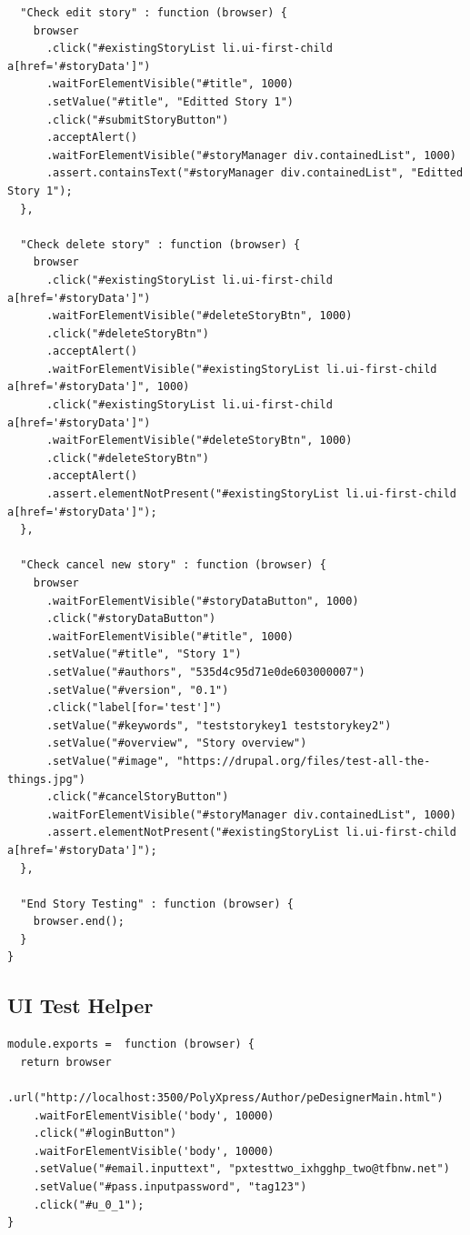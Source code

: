 \documentclass[12pt]{ucthesis}
\begin{document}
\begin{lstlisting}
  "Check edit story" : function (browser) {
    browser
      .click("#existingStoryList li.ui-first-child a[href='#storyData']")
      .waitForElementVisible("#title", 1000)
      .setValue("#title", "Editted Story 1")
      .click("#submitStoryButton")
      .acceptAlert()
      .waitForElementVisible("#storyManager div.containedList", 1000)
      .assert.containsText("#storyManager div.containedList", "Editted Story 1");
  },

  "Check delete story" : function (browser) {
    browser
      .click("#existingStoryList li.ui-first-child a[href='#storyData']")
      .waitForElementVisible("#deleteStoryBtn", 1000)
      .click("#deleteStoryBtn")
      .acceptAlert()
      .waitForElementVisible("#existingStoryList li.ui-first-child a[href='#storyData']", 1000)
      .click("#existingStoryList li.ui-first-child a[href='#storyData']")
      .waitForElementVisible("#deleteStoryBtn", 1000)
      .click("#deleteStoryBtn")
      .acceptAlert()
      .assert.elementNotPresent("#existingStoryList li.ui-first-child a[href='#storyData']");
  },

  "Check cancel new story" : function (browser) {
    browser
      .waitForElementVisible("#storyDataButton", 1000)
      .click("#storyDataButton")
      .waitForElementVisible("#title", 1000)
      .setValue("#title", "Story 1")
      .setValue("#authors", "535d4c95d71e0de603000007")
      .setValue("#version", "0.1")
      .click("label[for='test']")
      .setValue("#keywords", "teststorykey1 teststorykey2")
      .setValue("#overview", "Story overview")
      .setValue("#image", "https://drupal.org/files/test-all-the-things.jpg")
      .click("#cancelStoryButton")
      .waitForElementVisible("#storyManager div.containedList", 1000)
      .assert.elementNotPresent("#existingStoryList li.ui-first-child a[href='#storyData']");
  },

  "End Story Testing" : function (browser) {
    browser.end();
  }
}
\end{lstlisting}

\subsection{UI Test Helper}
\begin{lstlisting}
module.exports =  function (browser) {
  return browser
    .url("http://localhost:3500/PolyXpress/Author/peDesignerMain.html")
    .waitForElementVisible('body', 10000)
    .click("#loginButton")
    .waitForElementVisible('body', 10000)
    .setValue("#email.inputtext", "pxtesttwo_ixhgghp_two@tfbnw.net")
    .setValue("#pass.inputpassword", "tag123")
    .click("#u_0_1");
}
\end{lstlisting}


\newpage





\nocite{*}
\end{document}
